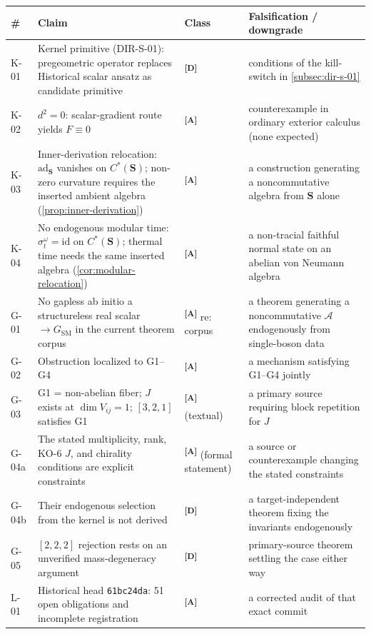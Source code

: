\documentclass[12pt,a4paper,twoside]{article}
\theoremstyle{plain}
\theoremstyle{definition}
\theoremstyle{remark}
\newcommand{\catmark}[1]{\textsuperscript{\textsf{\textbf{[#1]}}}}
\begin{document}
\begin{table}[htbp]
\centering\scriptsize
\begin{tabular}{@{}lp{5.3cm}lp{4.3cm}@{}}
\toprule
\# & Claim & Class & Falsification / downgrade \\
\midrule
K-01 & Kernel primitive (DIR-S-01): pregeometric operator replaces
Historical scalar ansatz as candidate primitive & \catmark{D} & conditions of the
kill-switch in \cref{subsec:dir-s-01} \\
K-02 & $d^2=0$: scalar-gradient route yields $F \equiv 0$ &
\catmark{A} & counterexample in ordinary exterior calculus (none
expected) \\
K-03 & Inner-derivation relocation: $\mathrm{ad}_{\mathbf S}$ vanishes on
$C^{\ast}(\mathbf S)$; non-zero curvature requires the inserted ambient
algebra (\cref{prop:inner-derivation}) & \catmark{A} & a construction
generating a noncommutative algebra from $\mathbf S$ alone \\
K-04 & No endogenous modular time: $\sigma^\omega_t=\mathrm{id}$ on
$C^{\ast}(\mathbf S)$; thermal time needs the same inserted algebra
(\cref{cor:modular-relocation}) & \catmark{A} & a non-tracial faithful normal
state on an abelian von Neumann algebra \\
G-01 & No gapless ab initio a structureless real scalar $\to G_{\mathrm{SM}}$ in the current
theorem corpus & \catmark{A} re: corpus & a theorem generating a
noncommutative $\mathcal A$ endogenously from single-boson data \\
G-02 & Obstruction localized to G1--G4 & \catmark{A} & a mechanism
satisfying G1--G4 jointly \\
G-03 & G1 = non-abelian fiber; $J$ exists at $\dim V_{ij}=1$;
$[3,2,1]$ satisfies G1 & \catmark{A} (textual) & a primary source
requiring block repetition for $J$ \\
G-04a & The stated multiplicity, rank, KO-6 $J$, and chirality conditions are explicit constraints & \catmark{A} (formal statement) & a source or counterexample changing the stated constraints \\
G-04b & Their endogenous selection from the kernel is not derived & \catmark{D} & a target-independent theorem fixing the invariants endogenously \\
G-05 & $[2,2,2]$ rejection rests on an unverified mass-degeneracy
argument & \catmark{D} & primary-source theorem settling the case
either way \\
L-01 & Historical head \texttt{61bc24da}: 51 open obligations and incomplete registration & \catmark{A} & a corrected audit of that exact commit \\

\end{tabular}
\end{table}
\end{document}
